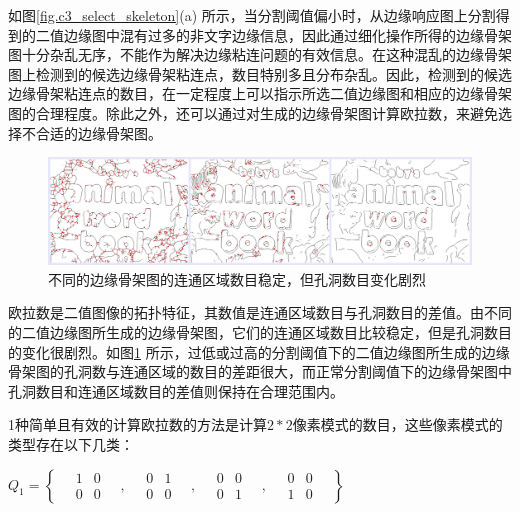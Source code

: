         如图\ref{fig.c3_select_skeleton}(a) 所示，当分割阈值偏小时，从边缘响应图上分割得到的二值边缘图中混有过多的非文字边缘信息，因此通过细化操作所得的边缘骨架图十分杂乱无序，不能作为解决边缘粘连问题的有效信息。在这种混乱的边缘骨架图上检测到的候选边缘骨架粘连点，数目特别多且分布杂乱。因此，检测到的候选边缘骨架粘连点的数目，在一定程度上可以指示所选二值边缘图和相应的边缘骨架图的合理程度。除此之外，还可以通过对生成的边缘骨架图计算欧拉数，来避免选择不合适的边缘骨架图。

        \begin{figure}[htbp]
        \centering
        \includegraphics[width=\textwidth]{./figures/c3_compare_skeleton.jpg}
        \caption{不同的边缘骨架图的连通区域数目稳定，但孔洞数目变化剧烈}
        \label{fig.c3_compare_skeleton}
        \end{figure}

        欧拉数是二值图像的拓扑特征，其数值是连通区域数目与孔洞数目的差值。由不同的二值边缘图所生成的边缘骨架图，它们的连通区域数目比较稳定，但是孔洞数目的变化很剧烈。如图\ref{fig.c3_compare_skeleton} 所示，过低或过高的分割阈值下的二值边缘图所生成的边缘骨架图的孔洞数与连通区域的数目的差距很大，而正常分割阈值下的边缘骨架图中孔洞数目和连通区域数目的差值则保持在合理范围内。

        1种简单且有效的计算欧拉数的方法是计算$2*2$像素模式的数目，这些像素模式的类型存在以下几类：

        $Q_1 = \left\{
        \quad
        \begin{matrix} 1 & 0 \\ 0 & 0 \end{matrix}\quad,\quad
        \begin{matrix} 0 & 1 \\ 0 & 0 \end{matrix}\quad,\quad
        \begin{matrix} 0 & 0 \\ 0 & 1 \end{matrix}\quad,\quad
        \begin{matrix} 0 & 0 \\ 1 & 0 \end{matrix}
        \quad
        \right\}$

